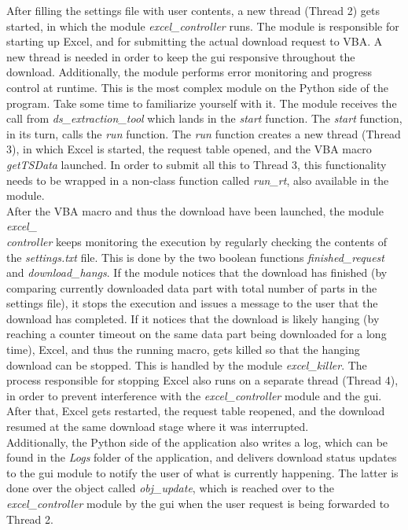 After filling the settings file with user contents, a new thread (Thread 2) gets started, in which the module \textit{excel\_controller} runs. The module is responsible for starting up Excel, and for submitting the actual download request to VBA. A new thread is needed in order to keep the gui responsive throughout the download. Additionally, the module performs error monitoring and progress control at runtime. This is the most complex module on the Python side of the program. Take some time to familiarize yourself with it. The module receives the call from \textit{ds\_extraction\_tool} which lands in the \textit{start} function. The \textit{start} function, in its turn, calls the \textit{run} function. The \textit{run} function creates a new thread (Thread 3), in which Excel is started, the request table opened, and the VBA macro \textit{getTSData} launched. In order to submit all this to Thread 3, this functionality needs to be wrapped in a non-class function called \textit{run\_rt}, also available in the module. \\

After the VBA macro and thus the download have been launched, the module \textit{excel\_ \\ controller} keeps monitoring the execution by regularly checking the contents of the \textit{settings.txt} file. This is done by the two boolean functions \textit{finished\_request} and \textit{download\_hangs}. If the module notices that the download has finished (by comparing currently downloaded data part with total number of parts in the settings file), it stops the execution and issues a message to the user that the download has completed. If it notices that the download is likely hanging (by reaching a counter timeout on the same data part being downloaded for a long time), Excel, and thus the running macro, gets killed so that the hanging download can be stopped. This is handled by the module \textit{excel\_killer}. The process responsible for stopping Excel also runs on a separate thread (Thread 4), in order to prevent interference with the \textit{excel\_controller} module and the gui. After that, Excel gets restarted, the request table reopened, and the download resumed at the same download stage where it was interrupted. \\

Additionally, the Python side of the application also writes a log, which can be found in the \textit{Logs} folder of the application, and delivers download status updates to the gui module to notify the user of what is currently happening. The latter is done over the object called \textit{obj\_update}, which is reached over to the \textit{excel\_controller} module by the gui when the user request is being forwarded to Thread 2. \\


